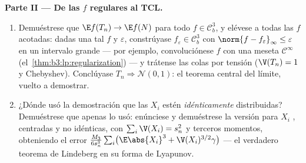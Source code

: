 \begin{problem}
\medskip
\noindent\textbf{Parte II --- De las $f$ regulares al TCL.}
\begin{enumerate}[resume]
  \item Demuéstrese que $\E f(T_n) \to \E f(N)$ para todo $f \in
        \mathcal C_b^3$, y elévese a todas las $f$
   acotadas: dadas una tal
  $f$ y $\varepsilon$, constrúyase $f_\varepsilon \in \mathcal C^3_b$
  con
        $\norm{f - f_\varepsilon}_\infty \leq \varepsilon$
        en un intervalo grande --- por ejemplo, convoluciónese $f$ con
        una meseta $\mathcal C^\infty$
        (el~\cref{thm:b3:lp:regularization}) --- y trátense las colas
        por tensión ($\V(T_n) = 1$ y Chebyshev). Conclúyase
        $T_n \Rightarrow \mathcal N(0, 1)$: el teorema central del
        límite, vuelto a demostrar. \item ¿Dónde usó la demostración que
        las $X_i$ estén \emph{idénticamente} distribuidas? Demuéstrese
        que apenas lo usó: enúnciese y demuéstrese la versión para $X_i$
        ,
        centradas y no idénticas, con $\sum_i\V(X_i) = s_n^2$ y terceros
        momentos, obteniendo el error
        $\frac{M_3}{6s_n^3}\sum_i\bigl(\E\abs{X_i}^3
        + \V(X_i)^{3/2}\gamma\bigr)$ --- el verdadero teorema de
        Lindeberg en su forma de Lyapunov.
\end{enumerate}


\end{problem}
